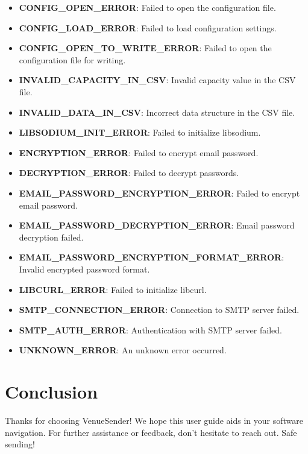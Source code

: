 \documentclass{article}
\begin{document}
\begin{itemize}
		\item \textbf{CONFIG\_OPEN\_ERROR}: Failed to open the configuration file.
		\item \textbf{CONFIG\_LOAD\_ERROR}: Failed to load configuration settings.
		\item \textbf{CONFIG\_OPEN\_TO\_WRITE\_ERROR}: Failed to open the configuration file for writing.
		\item \textbf{INVALID\_CAPACITY\_IN\_CSV}: Invalid capacity value in the CSV file.
		\item \textbf{INVALID\_DATA\_IN\_CSV}: Incorrect data structure in the CSV file.
		\item \textbf{LIBSODIUM\_INIT\_ERROR}: Failed to initialize libsodium.
		\item \textbf{ENCRYPTION\_ERROR}: Failed to encrypt email password.
		\item \textbf{DECRYPTION\_ERROR}: Failed to decrypt passwords.
		\item \textbf{EMAIL\_PASSWORD\_ENCRYPTION\_ERROR}: Failed to encrypt email password.
		\item \textbf{EMAIL\_PASSWORD\_DECRYPTION\_ERROR}: Email password decryption failed.
		\item \textbf{EMAIL\_PASSWORD\_ENCRYPTION\_FORMAT\_ERROR}: Invalid encrypted password format.
		\item \textbf{LIBCURL\_ERROR}: Failed to initialize libcurl.
		\item \textbf{SMTP\_CONNECTION\_ERROR}: Connection to SMTP server failed.
		\item \textbf{SMTP\_AUTH\_ERROR}: Authentication with SMTP server failed.
		\item \textbf{UNKNOWN\_ERROR}: An unknown error occurred.
	\end{itemize}
	
	\section*{Conclusion}
	Thanks for choosing VenueSender! We hope this user guide aids in your software navigation. For further assistance or feedback, don't hesitate to reach out. Safe sending!
	
\end{document}
